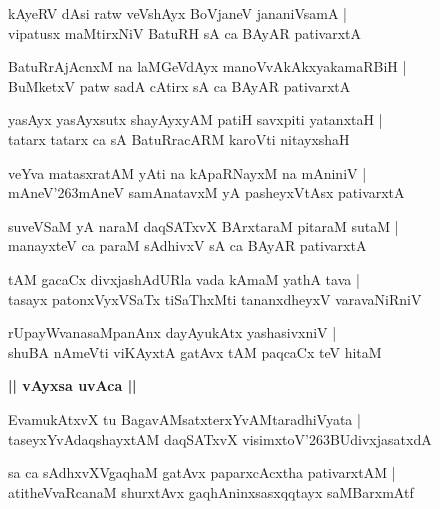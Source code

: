 \documentclass[twoside,12pt,openright]{book}
\def\S{\char'263}
\newcounter{shloka}[chapter]
\def\uvaca#1{\centerline{{\large\textbf{#1}}}}
\begin{document}
\begin{shloka}%
kAyeRV dAsi ratw veVshAyx BoVjaneV jananiVsamA |\\
vipatusx maMtirxNiV BatuRH sA ca BAyAR pativarxtA 
\end{shloka}

\begin{shloka}%
BatuRrAjAcnxM na laMGeVdAyx manoVvAkAkxyakamaRBiH |\\
BuMketxV patw sadA cAtirx sA ca BAyAR pativarxtA 
\end{shloka}

\begin{shloka}%
yasAyx yasAyxsutx shayAyxyAM patiH savxpiti yatanxtaH |\\
tatarx tatarx ca sA BatuRracARM karoVti nitayxshaH 
\end{shloka}

\begin{shloka}%
veYva matasxratAM yAti na kApaRNayxM na mAniniV |\\
mAneV\S mAneV samAnatavxM yA pasheyxVtAsx pativarxtA
\end{shloka}

\begin{shloka}%
suveVSaM yA naraM daqSATxvX BArxtaraM pitaraM sutaM |\\
manayxteV ca paraM sAdhivxV sA ca BAyAR pativarxtA 
\end{shloka}

\begin{shloka}%
tAM gacaCx divxjashAdURla vada kAmaM yathA tava |\\
tasayx patonxVyxVSaTx tiSaThxMti tananxdheyxV varavaNiRniV 
\end{shloka}

\begin{shloka}%
rUpayWvanasaMpanAnx dayAyukAtx yashasivxniV |\\
shuBA nAmeVti viKAyxtA gatAvx tAM paqcaCx teV hitaM 
\end{shloka}

\uvaca {|| vAyxsa uvAca ||}

\begin{shloka}%
EvamukAtxvX tu BagavAMsatxterxYvAMtaradhiVyata |\\
taseyxYvAdaqshayxtAM daqSATxvX visimxtoV\S BUdivxjasatxdA 
\end{shloka}

\begin{shloka}%
sa ca sAdhxvXVgaqhaM gatAvx paparxcAcxtha pativarxtAM |\\
atitheVvaRcanaM shurxtAvx gaqhAninxsasxqqtayx saMBarxmAtf
\end{shloka}
\end{document}
